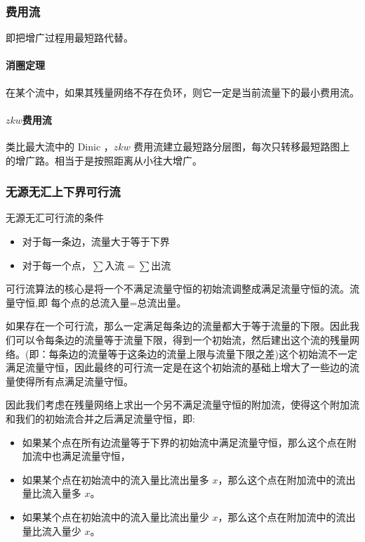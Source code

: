 \documentclass[UTF-8]{ctexart}
\begin{document}
			\subsubsection{费用流}
			即把增广过程用最短路代替。
			\paragraph{消圈定理} 在某个流中，如果其残量网络不存在负环，则它一定是当前流量下的最小费用流。
			\paragraph{$zkw$费用流} 类比最大流中的 Dinic ，$zkw$ 费用流建立最短路分层图，每次只转移最短路图上的增广路。相当于是按照距离从小往大增广。
			\subsubsection{无源无汇上下界可行流}
			无源无汇可行流的条件 
			\begin{itemize}
				\item 对于每一条边，流量大于等于下界  
				\item 对于每一个点，$\sum \mbox{入流}=\sum \mbox{出流}$
			\end{itemize} 
			
			可行流算法的核心是将一个不满足流量守恒的初始流调整成满足流量守恒的流。流量守恒,即 每个点的总流入量=总流出量。
			
			如果存在一个可行流，那么一定满足每条边的流量都大于等于流量的下限。因此我们可以令每条边的流量等于流量下限，得到一个初始流，然后建出这个流的残量网络。(即：每条边的流量等于这条边的流量上限与流量下限之差)这个初始流不一定满足流量守恒，因此最终的可行流一定是在这个初始流的基础上增大了一些边的流量使得所有点满足流量守恒。  
			
			因此我们考虑在残量网络上求出一个另不满足流量守恒的附加流，使得这个附加流和我们的初始流合并之后满足流量守恒，即:  
			
			\begin{itemize}
				\item 如果某个点在所有边流量等于下界的初始流中满足流量守恒，那么这个点在附加流中也满足流量守恒，
				\item 如果某个点在初始流中的流入量比流出量多 $x$，那么这个点在附加流中的流出量比流入量多 $x$。  
				\item 如果某个点在初始流中的流入量比流出量少 $x$，那么这个点在附加流中的流出量比流入量少 $x$。
			\end{itemize}
			
\end{document}
